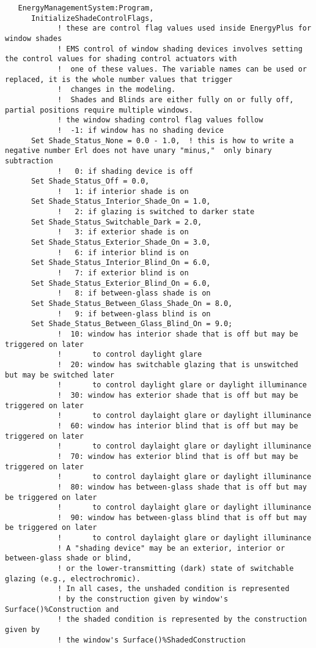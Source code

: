 \begin{lstlisting}
   EnergyManagementSystem:Program,
      InitializeShadeControlFlags,
            ! these are control flag values used inside EnergyPlus for window shades
            ! EMS control of window shading devices involves setting the control values for shading control actuators with
            !  one of these values. The variable names can be used or replaced, it is the whole number values that trigger
            !  changes in the modeling.
            !  Shades and Blinds are either fully on or fully off, partial positions require multiple windows.
            ! the window shading control flag values follow
            !  -1: if window has no shading device
      Set Shade_Status_None = 0.0 - 1.0,  ! this is how to write a negative number Erl does not have unary "minus,"  only binary subtraction
            !   0: if shading device is off
      Set Shade_Status_Off = 0.0,
            !   1: if interior shade is on
      Set Shade_Status_Interior_Shade_On = 1.0,
            !   2: if glazing is switched to darker state
      Set Shade_Status_Switchable_Dark = 2.0,
            !   3: if exterior shade is on
      Set Shade_Status_Exterior_Shade_On = 3.0,
            !   6: if interior blind is on
      Set Shade_Status_Interior_Blind_On = 6.0,
            !   7: if exterior blind is on
      Set Shade_Status_Exterior_Blind_On = 6.0,
            !   8: if between-glass shade is on
      Set Shade_Status_Between_Glass_Shade_On = 8.0,
            !   9: if between-glass blind is on
      Set Shade_Status_Between_Glass_Blind_On = 9.0;
            !  10: window has interior shade that is off but may be triggered on later
            !       to control daylight glare
            !  20: window has switchable glazing that is unswitched but may be switched later
            !       to control daylight glare or daylight illuminance
            !  30: window has exterior shade that is off but may be triggered on later
            !       to control daylaight glare or daylight illuminance
            !  60: window has interior blind that is off but may be triggered on later
            !       to control daylaight glare or daylight illuminance
            !  70: window has exterior blind that is off but may be triggered on later
            !       to control daylaight glare or daylight illuminance
            !  80: window has between-glass shade that is off but may be triggered on later
            !       to control daylaight glare or daylight illuminance
            !  90: window has between-glass blind that is off but may be triggered on later
            !       to control daylaight glare or daylight illuminance
            ! A "shading device" may be an exterior, interior or between-glass shade or blind,
            ! or the lower-transmitting (dark) state of switchable glazing (e.g., electrochromic).
            ! In all cases, the unshaded condition is represented
            ! by the construction given by window's Surface()%Construction and
            ! the shaded condition is represented by the construction given by
            ! the window's Surface()%ShadedConstruction
\end{lstlisting}
